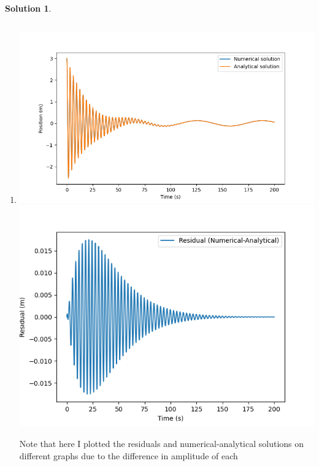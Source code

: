 \documentclass[10pt]{article}
\theoremstyle{definition}
\newtheorem{soln}{Solution}
\begin{document}
\begin{soln}
\begin{enumerate}[label=(\alph*)]
            \item \inputminted[breaklines, autogobble]{python3}{./python/q1/q1g.py}
                  \begin{center}
                        \includegraphics[scale=0.75]{Figure_4.png}
                        \includegraphics[scale=0.75]{Figure_4-1.png}
                  \end{center}
                  Note that here I plotted the residuals and numerical-analytical solutions on different graphs due to the difference
                  in amplitude of each
      \end{enumerate}
\end{soln}
\newpage
\end{document}

